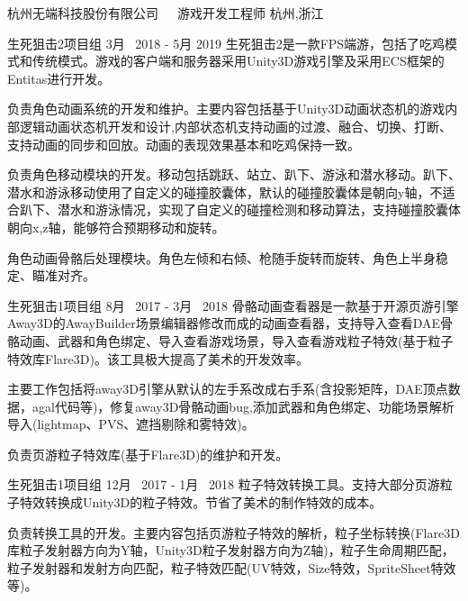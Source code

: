 \begin{cventries}

\cventrycompany
{杭州无端科技股份有限公司~~~游戏开发工程师} %
{杭州,浙江} %

\cventryproject
{生死狙击2项目组} %
{3月~ 2018 - 5月 2019} %
{生死狙击2是一款FPS端游，包括了吃鸡模式和传统模式。游戏的客户端和服务器采用Unity3D游戏引擎及采用ECS框架的Entitas进行开发。}
{ %
\begin{cvitems}
\item {负责角色动画系统的开发和维护。主要内容包括基于Unity3D动画状态机的游戏内部逻辑动画状态机开发和设计,内部状态机支持动画的过渡、融合、切换、打断、支持动画的同步和回放。动画的表现效果基本和吃鸡保持一致。}
\item{负责角色移动模块的开发。移动包括跳跃、站立、趴下、游泳和潜水移动。趴下、潜水和游泳移动使用了自定义的碰撞胶囊体，默认的碰撞胶囊体是朝向y轴，不适合趴下、潜水和游泳情况，实现了自定义的碰撞检测和移动算法，支持碰撞胶囊体朝向x,z轴，能够符合预期移动和旋转。}
\item{角色动画骨骼后处理模块。角色左倾和右倾、枪随手旋转而旋转、角色上半身稳定、瞄准对齐。}
\end{cvitems}
}

\cventryproject
{生死狙击1项目组} %
{8月~ 2017 - 3月~ 2018} %
{骨骼动画查看器是一款基于开源页游引擎Away3D的AwayBuilder场景编辑器修改而成的动画查看器，支持导入查看DAE骨骼动画、武器和角色绑定、导入查看游戏场景，导入查看游戏粒子特效(基于粒子特效库Flare3D)。该工具极大提高了美术的开发效率。}
{ %
	\begin{cvitems}
		\item {主要工作包括将away3D引擎从默认的左手系改成右手系(含投影矩阵，DAE顶点数据，agal代码等)，修复away3D骨骼动画bug,添加武器和角色绑定、功能场景解析导入(lightmap、PVS、遮挡剔除和雾特效)。}
		\item {负责页游粒子特效库(基于Flare3D)的维护和开发。}
	\end{cvitems}
}
\cventryproject
{生死狙击1项目组} %
{12月~ 2017 - 1月~ 2018} %
{粒子特效转换工具。支持大部分页游粒子特效转换成Unity3D的粒子特效。节省了美术的制作特效的成本。}
{ %
	\begin{cvitems}
		\item {负责转换工具的开发。主要内容包括页游粒子特效的解析，粒子坐标转换(Flare3D库粒子发射器方向为Y轴，Unity3D粒子发射器方向为Z轴)，粒子生命周期匹配，粒子发射器和发射方向匹配，粒子特效匹配(UV特效，Size特效，SpriteSheet特效等)。}
	\end{cvitems}
}



\end{cventries}

